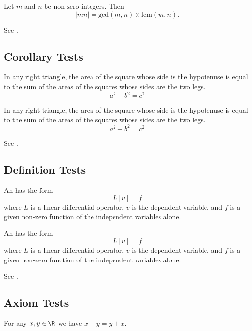 \begin{proposition}\label{prop:test}
    Let $m$ and $n$ be non-zero integers. Then
    \[
        |mn| = \mathrm{gcd}(m,n) \times \mathrm{lcm}(m,n).
    \]
\end{proposition}

See .

\subsection*{Corollary Tests}
\begin{corollary}
    In any right triangle, the area of the square whose side is the hypotenuse is equal to the sum of the areas of the squares whose sides are the two legs.
    \[
        a^2 + b^2 = c^2
    \]
\end{corollary}

\begin{corollary}\label{coro:test}
    In any right triangle, the area of the square whose side is the hypotenuse is equal to the sum of the areas of the squares whose sides are the two legs.
    \[
        a^2 + b^2 = c^2
    \]
\end{corollary}

See .

\subsection*{Definition Tests}
\begin{definition}
    An  has the form
    \[
        L[v] = f
    \]
    where $L$ is a linear differential operator, $v$ is the dependent
    variable, and $f$ is a given non-zero function of the independent
    variables alone.
\end{definition}

\begin{definition}\label{def:test}
    An  has the form
    \[
        L[v] = f
    \]
    where $L$ is a linear differential operator, $v$ is the dependent
    variable, and $f$ is a given non-zero function of the independent
    variables alone.
\end{definition}

See .

\subsection*{Axiom Tests}
\begin{axiom}
    For any $x, y \in \R$ we have $x + y = y + x$.
\end{axiom}


